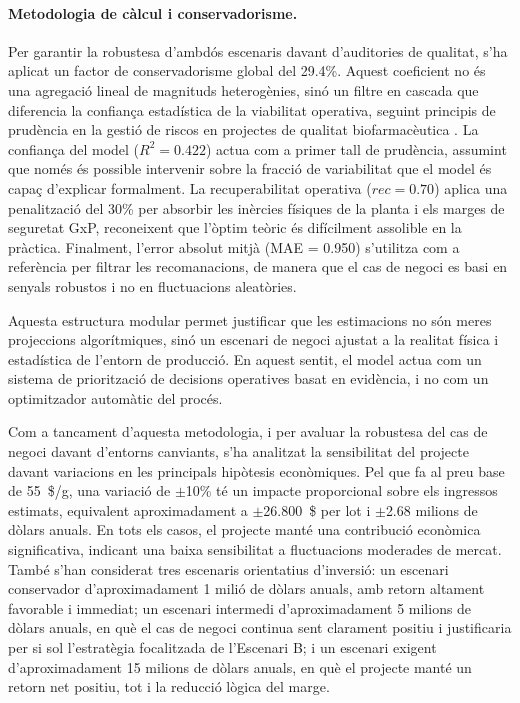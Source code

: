 \paragraph{Metodologia de càlcul i conservadorisme.} Per garantir la robustesa d'ambdós escenaris davant d'auditories de qualitat, s'ha aplicat un factor de conservadorisme global del 29.4\%. Aquest coeficient no és una agregació lineal de magnituds heterogènies, sinó un filtre en cascada que diferencia la confiança estadística de la viabilitat operativa, seguint principis de prudència en la gestió de riscos en projectes de qualitat biofarmacèutica \cite{rathore2009_qbd}. La confiança del model ($R^2 = 0.422$) actua com a primer tall de prudència, assumint que només és possible intervenir sobre la fracció de variabilitat que el model és capaç d'explicar formalment. La recuperabilitat operativa ($rec=0.70$) aplica una penalització del 30\% per absorbir les inèrcies físiques de la planta i els marges de seguretat GxP, reconeixent que l'òptim teòric és difícilment assolible en la pràctica. Finalment, l'error absolut mitjà (MAE = 0.950) s'utilitza com a referència per filtrar les recomanacions, de manera que el cas de negoci es basi en senyals robustos i no en fluctuacions aleatòries.

Aquesta estructura modular permet justificar que les estimacions no són meres projeccions algorítmiques, sinó un escenari de negoci ajustat a la realitat física i estadística de l'entorn de producció. En aquest sentit, el model actua com un sistema de priorització de decisions operatives basat en evidència, i no com un optimitzador automàtic del procés.

Com a tancament d'aquesta metodologia, i per avaluar la robustesa del cas de negoci davant d'entorns canviants, s'ha analitzat la sensibilitat del projecte davant variacions en les principals hipòtesis econòmiques. Pel que fa al preu base de 55~\$/g, una variació de $\pm$10\% té un impacte proporcional sobre els ingressos estimats, equivalent aproximadament a $\pm$26.800~\$ per lot i $\pm$2.68 milions de dòlars anuals. En tots els casos, el projecte manté una contribució econòmica significativa, indicant una baixa sensibilitat a fluctuacions moderades de mercat. També s'han considerat tres escenaris orientatius d'inversió: un escenari conservador d'aproximadament 1 milió de dòlars anuals, amb retorn altament favorable i immediat; un escenari intermedi d'aproximadament 5 milions de dòlars anuals, en què el cas de negoci continua sent clarament positiu i justificaria per si sol l'estratègia focalitzada de l'Escenari B; i un escenari exigent d'aproximadament 15 milions de dòlars anuals, en què el projecte manté un retorn net positiu, tot i la reducció lògica del marge.


